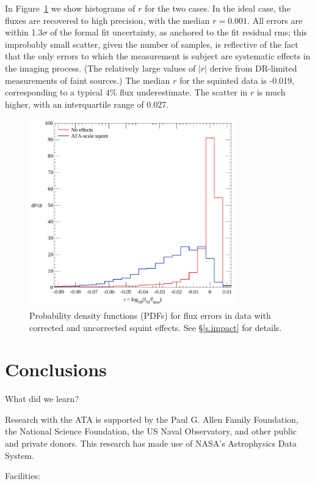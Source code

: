 \documentclass[preprint]{aastex}
\begin{document}
In Figure~\ref{fig.sqfluxsim} we show histograms of $r$ for the two
cases. In the ideal case, the fluxes are recovered to high precision,
with the median $r = 0.001$. All errors are within 1.3$\sigma$ of the
formal fit uncertainty, as anchored to the fit residual rms; this
improbably small scatter, given the number of samples, is reflective
of the fact that the only errors to which the measurement is subject
are systematic effects in the imaging process. (The relatively large
values of $|r|$ derive from DR-limited measurements of faint sources.)
The median $r$ for the squinted data is -0.019, corresponding to a
typical 4\% flux underestimate. The scatter in $r$ is much higher,
with an interquartile range of 0.027.

\begin{figure}[htb]
\begin{center}
\includegraphics[width=0.8\textwidth]{images/sqfluxsim}
\caption{Probability density functions (PDFs) for flux errors in data
  with corrected and uncorrected squint effects. See \S\ref{s.impact}
  for details.
  \label{fig.sqfluxsim}}
\end{center}
\end{figure}


\section{Conclusions}\label{s.conclusions}
What did we learn?


\acknowledgments
Research with the ATA is supported by the Paul G. Allen Family
Foundation, the National Science Foundation, the US Naval Observatory,
and other public and private donors. This research has made use of
NASA's Astrophysics Data System.

Facilities: 



\end{document}
